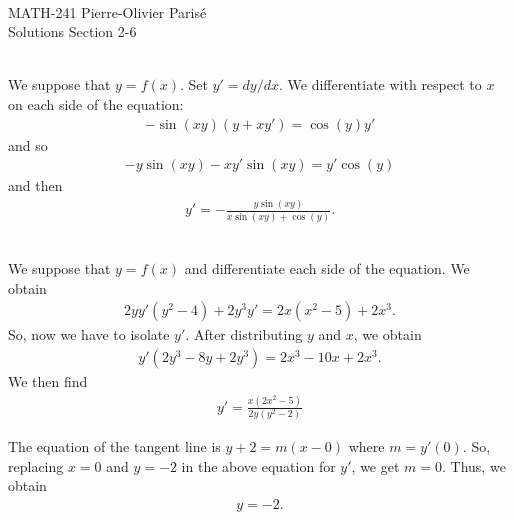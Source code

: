 


	\noindent \hrulefill \\
	MATH-241 \hfill Pierre-Olivier Paris{\'e}\\
	Solutions Section 2-6 \hfill \semester \\\vspace*{-1cm}
	
	\noindent\hrulefill
	
	\spc
	
	\\
	We suppose that $y = f(x)$. Set $y' = dy/dx$. We differentiate with respect to $x$ on each side of the equation:
		\begin{align*}
		- \sin (xy) (y + x y' ) = \cos (y) y'
		\end{align*}			
	and so
		\begin{align*}
		-y \sin (xy) - xy' \sin (xy) = y' \cos (y)
		\end{align*}
	and then
		\begin{align*}
		y' = -\frac{y \sin (xy)}{x \sin (xy) + \cos (y)} .
		\end{align*}
	
	\spc
	
	\\
	We suppose that $y = f(x)$ and differentiate each side of the equation. We obtain
		\begin{align*}
		2y y' (y^2 - 4) + 2y^3 y' = 2x (x^2 - 5) + 2 x^3 .
		\end{align*}
	So, now we have to isolate $y'$. After distributing $y$ and $x$, we obtain
		\begin{align*}
		y' (2y^3 - 8y + 2y^3) = 2x^3 - 10x + 2x^3 .
		\end{align*}
	We then find
		\begin{align*}
		y' = \frac{x(2x^2 - 5)}{2y (y^2 - 2)}
		\end{align*}
	
	The equation of the tangent line is $y + 2 = m (x - 0)$ where $m = y' (0)$. So, replacing $x = 0$ and $y = -2$ in the above equation for $y'$, we get $m = 0$. Thus, we obtain
		\begin{align*}
		y = -2 .
		\end{align*}
	
